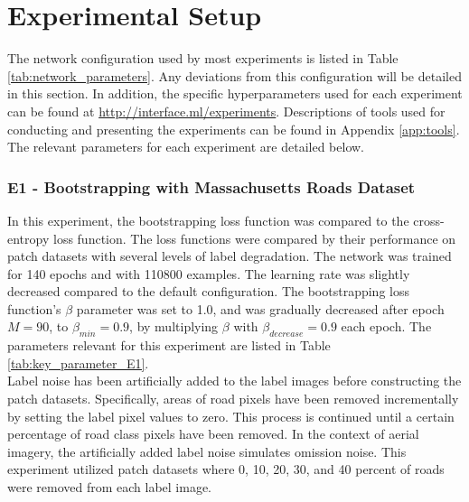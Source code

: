 \section{Experimental Setup}
\label{sec:experimentalSetup}
The network configuration used by most experiments is listed in Table \ref{tab:network_parameters}. Any deviations from this configuration will be detailed in this section. In addition, the specific hyperparameters used for each experiment can be found at \url{http://interface.ml/experiments}. Descriptions of tools used for conducting and presenting the experiments can be found in Appendix \ref{app:tools}. The relevant parameters for each experiment are detailed below.\\ 

\subsubsection{E1 - Bootstrapping with Massachusetts Roads Dataset}
In this experiment, the bootstrapping loss function was compared to the cross-entropy loss function. The loss functions were compared by their performance on patch datasets with several levels of label degradation. The network was trained for 140 epochs and with 110800 examples. The learning rate was slightly decreased compared to the default configuration. The bootstrapping loss function's $\beta$ parameter was set to 1.0, and was gradually decreased after epoch $M =90$, to $\beta_{min} = 0.9$, by multiplying $\beta$ with $\beta_{decrease}=0.9$ each epoch. The parameters relevant for this experiment are listed in Table \ref{tab:key_parameter_E1}.\\

Label noise has been artificially added to the label images before constructing the patch datasets. Specifically, areas of road pixels have been removed incrementally by setting the label pixel values to zero. This process is continued until a certain percentage of road class pixels have been removed. In the context of aerial imagery, the artificially added label noise simulates omission noise. This experiment utilized patch datasets where 0, 10, 20, 30, and 40 percent of roads were removed from each label image.\\ 

